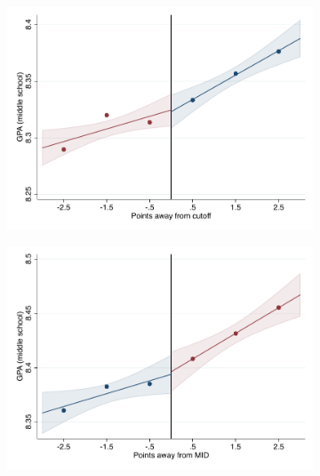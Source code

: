 \documentclass[oneside,11pt]{article}
\begin{document}
\begin{figure}[H]

    \ContinuedFloat
    \caption{(Continued) RD plots for balance variables across those assigned to IPN high-school, and those who are not\label{fig:Balance_rd_plot_IPN_2}}
    \begin{center}
    
    \begin{subfigure}{0.475\textwidth}
        \centering
        \includegraphics[width=\textwidth]{04_Figures/rd_plot_tau_sus_prom_IPN3.pdf}
    \end{subfigure}
    \begin{subfigure}{0.475\textwidth}
        \centering
        \includegraphics[width=\textwidth]{04_Figures/rd_plot_mid_sus_prom_IPN3.pdf}
    \end{subfigure}


\end{center}
\end{figure}
\end{document}
